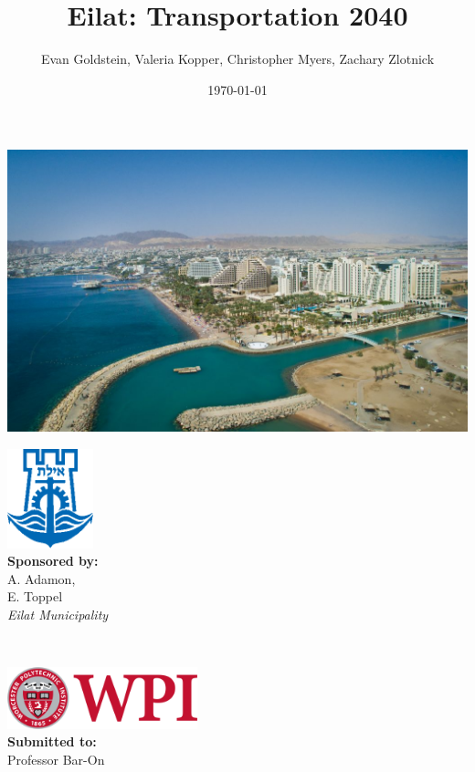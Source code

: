 \documentclass[12pt]{article}                       %
\title{Eilat: Transportation 2040}
\author{Evan Goldstein, Valeria Kopper, Christopher Myers, Zachary Zlotnick}
\date{\today}
\begin{document}
\maketitle
\begin{center}
    \includegraphics[width=1\columnwidth]{images/eilat.jpg}
\end{center}
\vspace{1cm}
\begin{minipage}{0.5\textwidth}
    \begin{flushleft} \large
        \includegraphics[width=2.5cm]{images/eilat_logo.png} \\
        \textbf{Sponsored by:} \\
        A. Adamon, \\
        E. Toppel \\
        \textit{Eilat Municipality}
    \end{flushleft}
\end{minipage}
~
\begin{minipage}{0.5\textwidth}
    \begin{flushright} \large
        \includegraphics[width=5.5cm]{images/WPI_logo.png} \\
        \vspace{0.7cm}
        \textbf{Submitted to:}\\
        Professor Bar-On
        \vspace{1.5cm}
    \end{flushright}
\end{minipage}
\newpage
\end{document}
